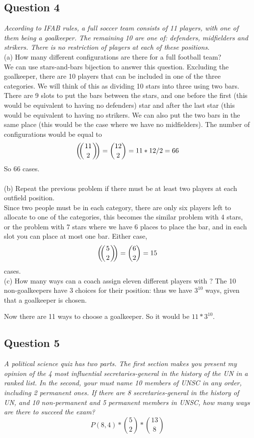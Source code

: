 \documentclass{article}
\def\multiset#1#2{\ensuremath{\left(\kern-.3em\left(\genfrac{}{}{0pt}{}{#1}{#2}\right)\kern-.3em\right)}}
\begin{document}
\subsection{Question 4}
\emph{According to IFAB rules, a full soccer team consists of 11 players, with one of them being a goalkeeper. The remaining 10 are one of: defenders, midfielders and strikers. There is no restriction of players at each of these positions.}
\bigskip
\\
(a) How many different configurations are there for a full football team?
\medskip
\\
We can use stars-and-bars bijection to answer this question. Excluding the goalkeeper, there are 10 players that can be included in one of the three categories. We will think of this as dividing 10 stars into three using two bars. There are 9 slots to put the bars between the stars, and one before the first (this would be equivalent to having no defenders) star and after the last star (this would be equivalent to having no strikers. We can also put the two bars in the same place (this would be the case where we have no midfielders).
 The number of configurations would be equal to 
$$\multiset{11}{2} = {12\choose2} = 11*12/2 = 66$$
So 66 cases.
\\
\bigskip
\\
(b) Repeat the previous problem if there must be at least two players at each outfield position.
\medskip
\\Since two people must be in each category, there are only six players left to allocate to one of the categories, this becomes the similar problem with 4 stars, or the problem with 7 stars where we have 6 places to place the bar, and in each slot you can place at most one bar. Either case, 
$$\multiset{5}{2} = {6\choose 2} =  15$$ 
cases.
\\
\bigskip
(c) How many ways can a coach assign eleven different players with ?
The 10 non-goalkeepers have 3 choices for their position: thus we have $3^{10}$ ways, given that a goalkeeper is chosen.

Now there are 11 ways to choose a goalkeeper. So it would be $11*3^{10}$.
\newpage
\subsection{Question 5}
\emph{A political science quiz has two parts. The first section makes you present my opinion of the 4 most influential secretaries-general in the history of the UN in a ranked list. In the second, your must name 10 members of UNSC in any order, including 2 permanent ones. If there are 8 secretaries-general in the history of UN, and 10 non-permanent and 5 permanent members in UNSC, how many ways are there to succeed the exam?}
\medskip
$$P(8, 4) * {5\choose2} * {13 \choose 8}$$
\bigskip
\end{document}
